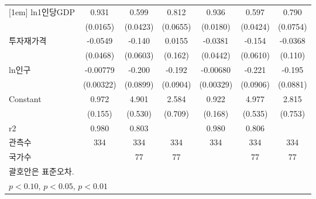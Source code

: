 \begin{table}[htbp]
{\begin{tabular}{l*{6}{c}}
[1em]
ln1인당GDP        &       0.931\sym{***}&       0.599\sym{***}&       0.812\sym{***}&       0.936\sym{***}&       0.597\sym{***}&       0.790\sym{***}\\
                    &    (0.0165)         &    (0.0423)         &    (0.0655)         &    (0.0180)         &    (0.0424)         &    (0.0754)         \\
[1em]
투자재가격        &     -0.0549         &      -0.140\sym{**} &      0.0155         &     -0.0381         &      -0.154\sym{**} &     -0.0368         \\
                    &    (0.0468)         &    (0.0603)         &     (0.162)         &    (0.0442)         &    (0.0610)         &     (0.110)         \\
[1em]
ln인구            &    -0.00779\sym{**} &      -0.200\sym{**} &      -0.192\sym{**} &    -0.00680\sym{**} &      -0.221\sym{**} &      -0.195\sym{**} \\
                    &   (0.00322)         &    (0.0899)         &    (0.0904)         &   (0.00329)         &    (0.0906)         &    (0.0881)         \\
[1em]
Constant            &       0.972\sym{***}&       4.901\sym{***}&       2.584\sym{***}&       0.922\sym{***}&       4.977\sym{***}&       2.815\sym{***}\\
                    &     (0.155)         &     (0.530)         &     (0.709)         &     (0.168)         &     (0.535)         &     (0.753)         \\
\hline
r2                  &       0.980         &       0.803         &                     &       0.980         &       0.806         &                     \\
관측수                   &         334         &         334         &         334         &         334         &         334         &         334         \\
국가수                 &                     &          77         &          77         &                     &          77         &          77         \\
\hline\hline
\multicolumn{7}{l}{\footnotesize  괄호안은 표준오차.}\\
\multicolumn{7}{l}{\footnotesize \sym{*} \(p<0.10\), \sym{**} \(p<0.05\), \sym{***} \(p<0.01\)}\\
\end{tabular}}
\end{table}